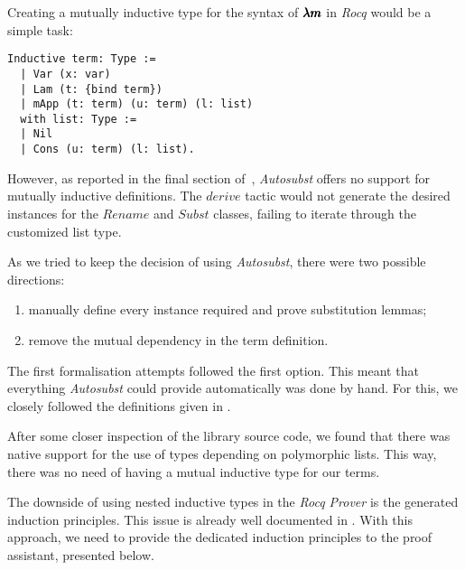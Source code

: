 Creating a mutually inductive type for the syntax of $\pmb{\lambda m}$ in \textit{Rocq} would be a simple task:
\begin{lstlisting}[language=Coq]
  Inductive term: Type :=
  | Var (x: var)
  | Lam (t: {bind term})
  | mApp (t: term) (u: term) (l: list)
  with list: Type :=
  | Nil
  | Cons (u: term) (l: list). 
\end{lstlisting}

However, as reported in the final section of~\cite{AutosubstSchafer}, \textit{Autosubst} offers no support for mutually inductive definitions.
The \lst$derive$ tactic would not generate the desired instances for the \lst$Rename$ and \lst$Subst$ classes, failing to iterate through the customized list type.

As we tried to keep the decision of using \textit{Autosubst}, there were two possible directions:
\begin{enumerate}
\item manually define every instance required and prove substitution lemmas;
\item remove the mutual dependency in the term definition.
\end{enumerate}

The first formalisation attempts followed the first option.
This meant that everything \textit{Autosubst} could provide automatically was done by hand.
For this, we closely followed the definitions given in \cite{AutosubstSchafer}.


After some closer inspection of the library source code, we found that there was native support for the use of types depending on polymorphic lists.
This way, there was no need of having a mutual inductive type for our terms.


The downside of using nested inductive types in the \textit{Rocq Prover} is the generated induction principles.
This issue is already well documented in \cite[Chapter~14.3]{CoqArt}.
With this approach, we need to provide the dedicated induction principles to the proof assistant, presented below.

